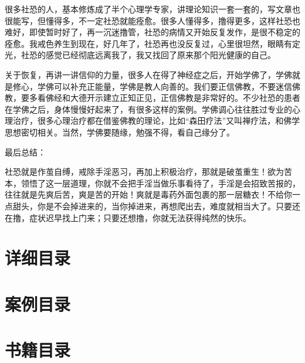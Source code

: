 \documentclass{ctexart}
\begin{document}
很多社恐的人，基本修炼成了半个心理学专家，讲理论知识一套一套的，写文章也很能写，但懂得多，不一定社恐就能痊愈。很多人懂得多，撸得更多，这样社恐也难好，即使暂时好了，再一沉迷撸管，社恐的病情又开始反复发作，是很不稳定的痊愈。我戒色养生到现在，好几年了，社恐再也没反复过，心里很坦然，眼睛有定光，社恐的感觉已经彻底远离我了，我又找回了原来那个阳光健康的自己。

关于恢复，再讲一讲信仰的力量，很多人在得了神经症之后，开始学佛了，学佛就是修心，学佛可以补充正能量，学佛是教人向善的。我们要正信佛教，不要迷信佛教，要多看佛经和大德开示建立正知正见，正信佛教是非常好的。不少社恐的患者在学佛之后，身体慢慢好起来了，有很多这样的案例。学佛调心往往胜过专业的心理治疗，很多心理治疗都在借鉴佛教的理论，比如“森田疗法”又叫禅疗法，和佛学思想密切相关。当然，学佛要随缘，勉强不得，看自己缘分了。

最后总结：

社恐就是作茧自缚，戒除手淫恶习，再加上积极治疗，那就是破茧重生！欲为苦本，领悟了这一层道理，你就不会把手淫当做乐事看待了，手淫是会招致苦报的，往往就是先爽后苦，爽是苦的开始！爽就是毒药外面包裹的那一层糖衣！不给你一点甜头，你是不会掉进来的，当你掉进来，再想爬出去，难度就相当大了。只要还在撸，症状迟早找上门来；只要还想撸，你就无法获得纯然的快乐。

\clearpage\appendix

\section{详细目录}

\setcounter{tocdepth}{5}
\renewcommand*{\contentsname}{}
\begin{multicols}{2}
    \tableofcontents
\end{multicols}

\section{案例目录}

\renewcommand*{\listtheoremname}{}
\begin{multicols}{2}
    \listoftheorems[ignoreall, show = case]
\end{multicols}

\section{书籍目录}

\renewcommand*{\listtheoremname}{}
\begin{multicols}{2}
    \listoftheorems[ignoreall, show = book]
\end{multicols}
\end{document}
